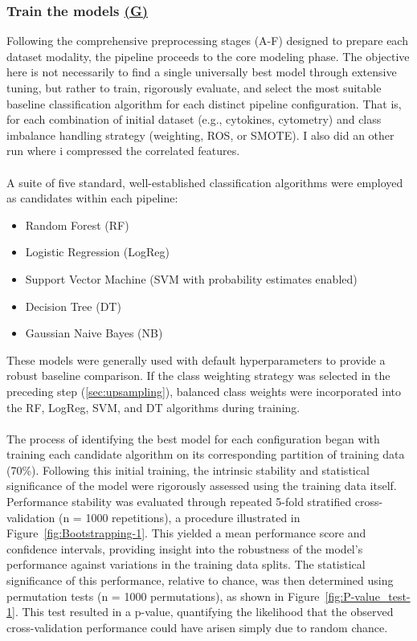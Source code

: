 \documentclass[12pt,a4paper]{report}
\begin{document}
\subsubsection*{Train the models \hyperref[fig:pipeline-1]{(G)}}
\noindent
Following the comprehensive preprocessing stages (A-F) designed to prepare each dataset modality, the pipeline proceeds to the core modeling phase. The objective here is not necessarily to find a single universally best model through extensive tuning, but rather to train, rigorously evaluate, and select the most suitable baseline classification algorithm for each distinct pipeline configuration. That is, for each combination of initial dataset (e.g., cytokines, cytometry) and class imbalance handling strategy (weighting, ROS, or SMOTE). I also did an other run where i compressed the correlated features.\\
\\
A suite of five standard, well-established classification algorithms were employed as candidates within each pipeline:
\begin{itemize}
    \item Random Forest (RF)
    \item Logistic Regression (LogReg)
    \item Support Vector Machine (SVM with probability estimates enabled)
    \item Decision Tree (DT)
    \item Gaussian Naive Bayes (NB)
\end{itemize}
These models were generally used with default hyperparameters to provide a robust baseline comparison. If the class weighting strategy was selected in the preceding step (\ref{sec:upsampling}), balanced class weights were incorporated into the RF, LogReg, SVM, and DT algorithms during training.\\
\\
The process of identifying the best model for each configuration began with training each candidate algorithm on its corresponding partition of training data (70\%). Following this initial training, the intrinsic stability and statistical significance of the model were rigorously assessed using the training data itself. Performance stability was evaluated through repeated 5-fold stratified cross-validation (n = 1000 repetitions), a procedure illustrated in Figure~\ref{fig:Bootstrapping-1}. This yielded a mean performance score and confidence intervals, providing insight into the robustness of the model's performance against variations in the training data splits. The statistical significance of this performance, relative to chance, was then determined using permutation tests (n = 1000 permutations), as shown in Figure~\ref{fig:P-value_test-1}. This test resulted in a p-value, quantifying the likelihood that the observed cross-validation performance could have arisen simply due to random chance.\\
\end{document}
